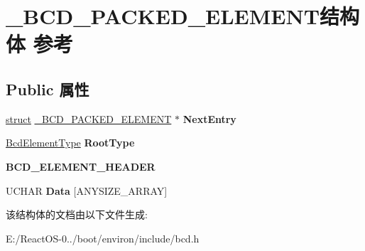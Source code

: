 \hypertarget{struct___b_c_d___p_a_c_k_e_d___e_l_e_m_e_n_t}{}\section{\+\_\+\+B\+C\+D\+\_\+\+P\+A\+C\+K\+E\+D\+\_\+\+E\+L\+E\+M\+E\+N\+T结构体 参考}
\label{struct___b_c_d___p_a_c_k_e_d___e_l_e_m_e_n_t}
\subsection*{Public 属性}
\begin{DoxyCompactItemize}
\item 
\mbox{\label{struct___b_c_d___p_a_c_k_e_d___e_l_e_m_e_n_t_a1f8e3030f9e1043582e97c055d340846}} 
\hyperlink{interfacestruct}{struct} \hyperlink{struct___b_c_d___p_a_c_k_e_d___e_l_e_m_e_n_t}{\+\_\+\+B\+C\+D\+\_\+\+P\+A\+C\+K\+E\+D\+\_\+\+E\+L\+E\+M\+E\+NT} $\ast$ {\bfseries Next\+Entry}
\item 
\mbox{\label{struct___b_c_d___p_a_c_k_e_d___e_l_e_m_e_n_t_a1295d27a25d30f8cb414941fc1c94e0b}} 
\hyperlink{struct_bcd_element_type}{Bcd\+Element\+Type} {\bfseries Root\+Type}
\item 
\mbox{\label{struct___b_c_d___p_a_c_k_e_d___e_l_e_m_e_n_t_ac4862707e6414d04db1162939aa6803c}} 
{\bfseries B\+C\+D\+\_\+\+E\+L\+E\+M\+E\+N\+T\+\_\+\+H\+E\+A\+D\+ER}
\item 
\mbox{\label{struct___b_c_d___p_a_c_k_e_d___e_l_e_m_e_n_t_a3f7ff993af6615dbc454348044d6bbc2}} 
U\+C\+H\+AR {\bfseries Data} \mbox{[}A\+N\+Y\+S\+I\+Z\+E\+\_\+\+A\+R\+R\+AY\mbox{]}
\end{DoxyCompactItemize}


该结构体的文档由以下文件生成\+:\begin{DoxyCompactItemize}
\item 
E\+:/\+React\+O\+S-\/0../boot/environ/include/bcd.\+h\end{DoxyCompactItemize}
